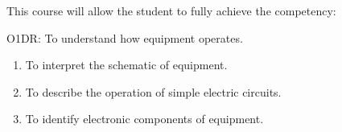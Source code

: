 {This course will allow the student to fully achieve the competency:

O1DR:  To understand how equipment operates.
\begin{enumerate}
\item To interpret the schematic of equipment.
\item To describe the operation of simple electric circuits.
\item To identify electronic components of equipment.
\end{enumerate}
\smallskip

}
